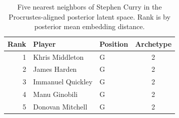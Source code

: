 \begin{table}[htbp]
  \centering\small
  \begin{tabular}{rllc}
    \toprule
    Rank & Player & Position & Archetype \\
    \midrule
    1 & Khris Middleton & G & 2 \\
    2 & James Harden & G & 2 \\
    3 & Immanuel Quickley & G & 2 \\
    4 & Manu Ginobili & G & 2 \\
    5 & Donovan Mitchell & G & 2 \\
    \bottomrule
  \end{tabular}
  \caption{Five nearest neighbors of Stephen Curry in the Procrustes-aligned posterior latent space. Rank is by posterior mean embedding distance.}
  \label{tab:Stephen_Curry_neighbors}
\end{table}

